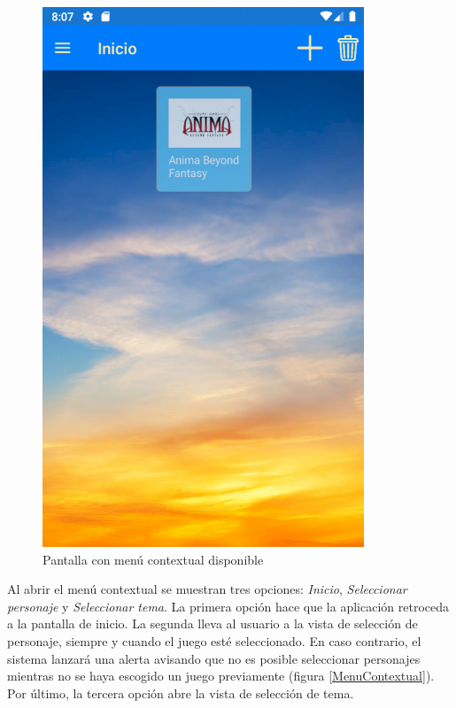 \begin{figure}[H]
    \centering
    \includegraphics[scale=0.7]{Figures/Capturas/PantallaInicio.png}
    \caption{Pantalla con menú contextual disponible}
    \label{MenuContextualOculto}    
\end{figure}

Al abrir el menú contextual se muestran tres opciones: \textit{Inicio}, \textit{Seleccionar personaje} y 
\textit{Seleccionar tema}. La primera opción hace que la aplicación retroceda a la pantalla de inicio.
La segunda lleva al usuario a la vista de selección de personaje, siempre y cuando el juego esté seleccionado. 
En caso contrario, el sistema lanzará una alerta avisando que no es posible seleccionar personajes mientras no 
se haya escogido un juego previamente (figura \ref*{MenuContextual}). Por último, la tercera opción abre la vista de 
selección de tema.

